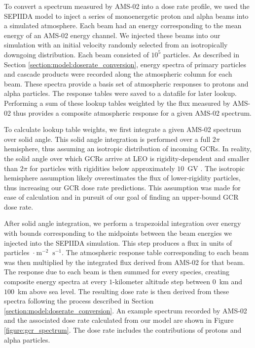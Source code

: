 \documentclass[draft]{agujournal2019}
\begin{document}
To convert a spectrum measured by AMS-02 into a dose rate profile, we used the SEPIIDA model to inject a series of monoenergetic proton and alpha beams into a simulated atmosphere. Each beam had an energy corresponding to the mean energy of an AMS-02 energy channel. We injected these beams into our simulation with an initial velocity randomly selected from an isotropically downgoing distribution. Each beam consisted of $10^5$ particles. As described in Section \ref{section:model:doserate_conversion}, energy spectra of primary particles and cascade products were recorded along the atmospheric column for each beam. These spectra provide a basis set of atmospheric responses to protons and alpha particles. The response tables were saved to a datafile for later lookup. Performing a sum of these lookup tables weighted by the flux measured by AMS-02 thus provides a composite atmospheric response for a given AMS-02 spectrum.

To calculate lookup table weights, we first integrate a given AMS-02 spectrum over solid angle. This solid angle integration is performed over a full $2\pi$ hemisphere, thus assuming an isotropic distribution of incoming GCRs. In reality, the solid angle over which GCRs arrive at LEO is rigidity-dependent and smaller than $2\pi$ for particles with rigidities below approximately $10$~GV \cite{chen2025}. The isotropic hemisphere assumption likely overestimates the flux of lower-rigidity particles, thus increasing our GCR dose rate predictions. This assumption was made for ease of calculation and in pursuit of our goal of finding an upper-bound GCR dose rate.

After solid angle integration, we perform a trapezoidal integration over energy with bounds corresponding to the midpoints between the beam energies we injected into the SEPIIDA simulation. This step produces a flux in units of particles~$\cdot~\text{m}^{-2}~\text{ s}^{-1}$. The atmospheric response table corresponding to each beam was then multiplied by the integrated flux derived from AMS-02 for that beam. The response due to each beam is then summed for every species, creating composite energy spectra at every $1$-kilometer altitude step between $0$~km and $100$~km above sea level. The resulting dose rate is then derived from these spectra following the process described in Section \ref{section:model:doserate_conversion}. An example spectrum recorded by AMS-02 and the associated dose rate calculated from our model are shown in Figure \ref{figure:gcr_spectrum}. The dose rate includes the contributions of protons and alpha particles.
\end{document}
